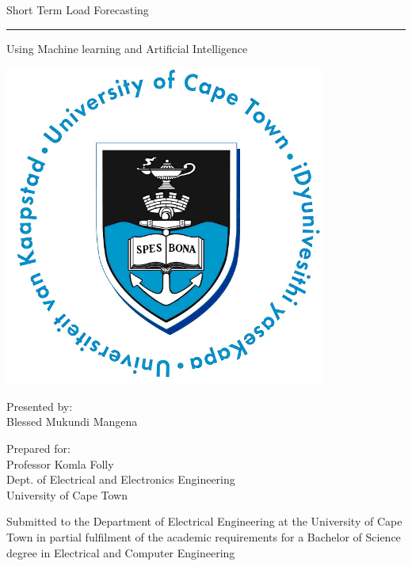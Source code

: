 \documentclass[a4paper,12pt]{report}
\begin{document}
	
	\thispagestyle{empty}
	{\Huge \begin{center}
			Short Term Load Forecasting 
			\hrule 
			{\Large Using Machine learning and Artificial Intelligence}
	\end{center}}
	
	\vskip 5mm
	\begin{center}
		\includegraphics[scale = 1]{images/UCT.jpg}
	\end{center}
	
	\vskip 5mm
	\begin{center}
		Presented by:\\
		Blessed Mukundi Mangena 		%
	\end{center}
	
	\vskip 10mm
	\begin{center}
		Prepared for:\\
		Professor Komla Folly\\ 		%
		Dept. of Electrical and Electronics Engineering\\University of Cape Town
	\end{center}
	
	
	\vskip 10mm
	\begin{center}
		Submitted to the Department of Electrical Engineering at the University of Cape Town in partial
		fulfilment of the academic requirements for a Bachelor of Science degree in Electrical and Computer Engineering
		
	\end{center}
	
\end{document}
